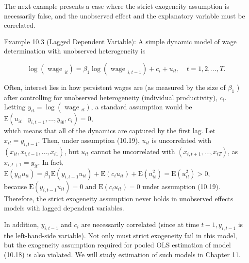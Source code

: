 \documentclass[10pt]{article}
\begin{document}
The next example presents a case where the strict exogeneity assumption is necessarily false, and the unobserved effect and the explanatory variable must be correlated.

Example 10.3 (Lagged Dependent Variable): A simple dynamic model of wage determination with unobserved heterogeneity is


\begin{equation*}
\log \left(\text { wage }_{i t}\right)=\beta_{1} \log \left(\text { wage }_{i, t-1}\right)+c_{i}+u_{i t}, \quad t=1,2, \ldots, T . \tag{10.18}
\end{equation*}


Often, interest lies in how persistent wages are (as measured by the size of $\beta_{1}$ ) after controlling for unobserved heterogeneity (individual productivity), $c_{i}$. Letting $y_{i t}= \log \left(\right.$ wage $\left._{i t}\right)$, a standard assumption would be\\
$\mathrm{E}\left(u_{i t} \mid y_{i, t-1}, \ldots, y_{i 0}, c_{i}\right)=0$,\\
which means that all of the dynamics are captured by the first lag. Let $x_{i t}=y_{i, t-1}$. Then, under assumption (10.19), $u_{i t}$ is uncorrelated with $\left(x_{i t}, x_{i, t-1}, \ldots, x_{i 1}\right)$, but $u_{i t}$ cannot be uncorrelated with $\left(x_{i, t+1}, \ldots, x_{i T}\right)$, as $x_{i, t+1}=y_{i t}$. In fact,\\
$\mathrm{E}\left(y_{i t} u_{i t}\right)=\beta_{1} \mathrm{E}\left(y_{i, t-1} u_{i t}\right)+\mathrm{E}\left(c_{i} u_{i t}\right)+\mathrm{E}\left(u_{i t}^{2}\right)=\mathrm{E}\left(u_{i t}^{2}\right)>0$,\\
because $\mathrm{E}\left(y_{i, t-1} u_{i t}\right)=0$ and $\mathrm{E}\left(c_{i} u_{i t}\right)=0$ under assumption (10.19). Therefore, the strict exogeneity assumption never holds in unobserved effects models with lagged dependent variables.

In addition, $y_{i, t-1}$ and $c_{i}$ are necessarily correlated (since at time $t-1, y_{i, t-1}$ is the left-hand-side variable). Not only must strict exogeneity fail in this model, but the exogeneity assumption required for pooled OLS estimation of model (10.18) is also violated. We will study estimation of such models in Chapter 11.
\end{document}
